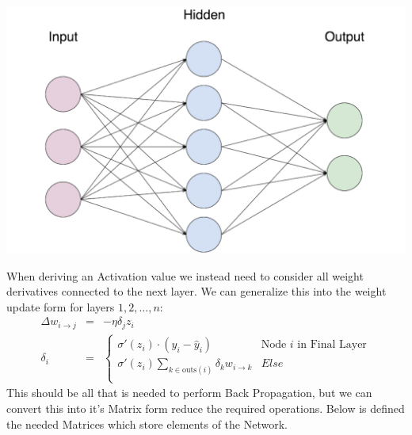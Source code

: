 \begin{flushleft}
                    \centerline{\includegraphics[width=14cm]{Images/InitialResearch/NeuralNetworkExample.png}}

                    When deriving an Activation value we instead need to consider all weight derivatives connected to the next layer. 
                    We can generalize this into the weight update form for layers $1,2, \hdots, n$:
                    \begin{eqnarray*}
                        \Delta w_{i \to j} &=& -\eta\delta_j z_i \\
                        \delta_i &=& 
                        \begin{cases}
                            \sigma'(z_i) \cdot (y_i - \hat{y}_i) & \text{Node $i$ in Final Layer} \\
                            \sigma'(z_i) \sum_{k\in\text{outs}(i)}  \delta_k w_{i \to k} & Else \\
                        \end{cases}
                    \end{eqnarray*}
                    This should be all that is needed to perform Back Propagation, but we can convert this into it's Matrix form reduce the required
                    operations. Below is defined the needed Matrices which store elements of the Network. \\


\end{flushleft}
